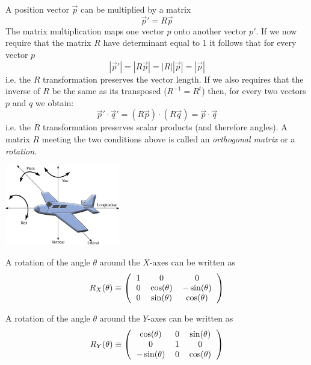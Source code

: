 \documentclass[12pt]{article}
\begin{document}
A position vector $\vec p$ can be multiplied by a matrix
\begin{equation}
\vec p' = R \vec p
\end{equation}
The matrix multiplication maps one vector $p$ onto another vector $p'$. If we now require that the matrix $R$ have determinant equal to 1 it follows that for every vector $p$
\begin{equation}
|\vec p'| = |R\vec p| = |R||\vec p| = |\vec p|
\end{equation}
i.e. the $R$ transformation preserves the vector length. If we also requires that the inverse of $R$ be the same as its transposed ($R^{-1}=R^t$) then, for every two vectors $p$ and $q$ we obtain:
\begin{equation}
\vec p' \cdot \vec q' = (R\vec p)\cdot(R\vec q) = \vec p \cdot \vec q
\end{equation}
i.e. the $R$ transformation preserves scalar products (and therefore angles).
A matrix $R$ meeting the two conditions above is called an {\it orthogonal matrix} or a {\it rotation}.

\begin{center}
\includegraphics[width=5cm]{images/plane.png}
\end{center}

A rotation of the angle $\theta$ around the $X$-axes can be written as
\begin{equation}
R_X(\theta) \equiv \left(\begin{tabular}{ccc}
1 & 0 & 0 \\
0 & $\cos(\theta)$ & $-\sin(\theta)$  \\
0 & $\sin(\theta)$ & $\cos(\theta) $ 
\end{tabular}\right)
\end{equation}

A rotation of the angle $\theta$ around the $Y$-axes can be written as
\begin{equation}
R_Y(\theta) \equiv \left(\begin{tabular}{ccc}
$\cos(\theta)$ & 0 & $\sin(\theta)$ \\
0 & 1 & 0 \\
$-\sin(\theta)$ & 0 & $\cos(\theta)$ 
\end{tabular}\right)
\end{equation}
\end{document}
